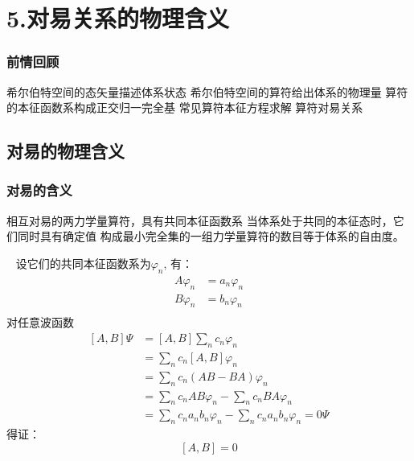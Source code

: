 
\section{5.对易关系的物理含义}

\begin{frame}
    \frametitle{前情回顾}
    \begin{itemize}
        \Item 希尔伯特空间的态矢量描述体系状态
        \Item 希尔伯特空间的算符给出体系的物理量
        \Item 算符的本征函数系构成正交归一完全基
        \Item 常见算符本征方程求解
        \Item 算符对易关系
    \end{itemize}   
\end{frame} 

\subsection{对易的物理含义}

\begin{frame} 
    \frametitle{对易的含义}
    \begin{enumerate}
        \Item  相互对易的两力学量算符，具有共同本征函数系
        \Item  当体系处于共同的本征态时，它们同时具有确定值
        \Item  构成最小完全集的一组力学量算符的数目等于体系的自由度。
    \end{enumerate}
\end{frame} 

\begin{frame} [allowframebreaks=]
    \证~ 设它们的共同本征函数系为{$\varphi_n$}, 有：
        \begin{equation*}
            \begin{split} 
            A\varphi_n&=a_n \varphi_n \\
            B\varphi_n&=b_n \varphi_n \\
            \end{split}  
        \end{equation*}  
        对任意波函数
        \begin{equation*}
            \begin{split} 
            [A,B]\Psi &= [A,B]\sum_n c_n \varphi_n \\
            &= \sum_n c_n [A,B]\varphi_n \\
            &= \sum_n c_n (AB-BA)\varphi_n\\
            &= \sum_n c_n AB\varphi_n- \sum_n c_n BA\varphi_n\\
            &= \sum_n c_n a_nb_n\varphi_n- \sum_n c_n a_nb_n\varphi_n=0\Psi
            \end{split}  
        \end{equation*}  
        得证： $$[A,B]=0$$
\end{frame} 

